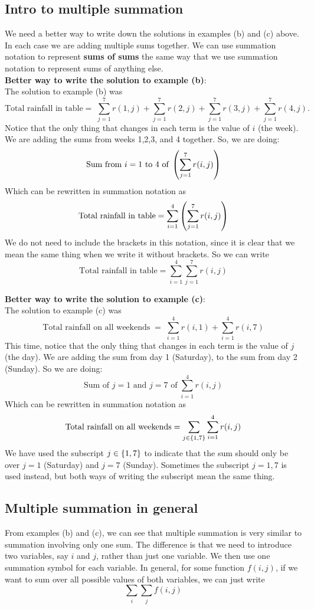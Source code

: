 \subsection{Intro to multiple summation}  \label{multiple summation}
We need a better way to write down the solutions in examples (b) and (c) above. In each case we are adding multiple sums together. We can use summation notation to represent \textbf{sums of sums} the same way that we use summation notation to represent sums of anything else. \\

\noindent \textbf{Better way to write the solution to example (b)}: \\
\noindent The solution to example (b) was
\[
\text{Total rainfall in table} =  \; \sum_{j = 1}^7 r(1,j) + \sum_{j = 1}^7 r(2,j) + \sum_{j = 1}^7 r(3,j) + \sum_{j = 1}^7r(4,j).
\]
Notice that the only thing that changes in each term is the value of $i$ (the week). We are adding the sums from weeks 1,2,3, and 4 together. So, we are doing:
\[
\text{Sum from $i = 1$ to $4$ of} \; \left( \sum_{j = 1}^7 r(i,j) \right)
\]
Which can be rewritten in summation notation as
\[
\text{Total rainfall in table} = \sum_{i = 1}^4\left(\sum_{j = 1}^7 r(i,j)\right)
\]
\noindent We do not need to include the brackets in this notation, since it is clear that we mean the same thing when we write it without brackets. So we can write
\[
\text{Total rainfall in table} = \sum_{i = 1}^4\sum_{j = 1}^7 r(i,j) \tag{leaving out the brackets}
\]
\bigskip

\noindent \textbf{Better way to write the solution to example (c)}: \\
\noindent The solution to example (c) was
\[
\text{Total rainfall on all weekends} \; = \; \sum_{i = 1}^4 r(i,1) + \sum_{i = 1}^4 r(i,7)
\]
This time, notice that the only thing that changes in each term is the value of $j$ (the day). We are adding the sum from day 1 (Saturday), to the sum from day 2 (Sunday). So we are doing:
\[
\text{Sum of $j = 1$ and $j = 7$ of} \; \sum_{i = 1}^4 r(i,j)
\]
Which can be rewritten in summation notation as
\[
\text{Total rainfall on all weekends} = \sum_{j \in \left\{1,7\right\}}\sum_{i = 1}^4 r(i,j)
\]
We have used the subscript $j \in \left\{1,7\right\}$ to indicate that the sum should only be over $j = 1$ (Saturday) and $j = 7$ (Sunday). Sometimes the subscript $j = 1,7$ is used instead, but both ways of writing the subscript mean the same thing. \\



\subsection{Multiple summation in general}
From examples (b) and (c), we can see that multiple summation is very similar to summation involving only one sum. The difference is that we need to introduce two variables, say $i$ and $j$, rather than just one variable. We then use one summation symbol for each variable. In general, for some function $f(i,j)$, if we want to sum over all possible values of both variables, we can just write
\[
\sum_i\sum_j f(i,j)
\]

